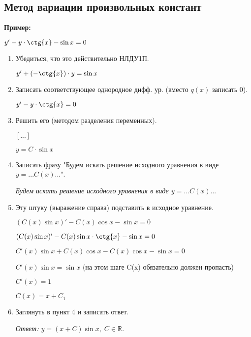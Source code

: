\documentclass[10pt, a4paper]{article}
\begin{document}
\subsection{Метод вариации произвольных констант}
\textbf{Пример:}
\par $y' - y \cdot \ctg{x} - \sin{x} = 0$
\begin{enumerate}
    \item Убедиться, что это действительно НЛДУ1П.
        \par $y' + (-\ctg{x}) \cdot y = \sin{x}$
    \item Записать соответствующее однородное дифф. ур. (вместо $q(x)$ записать $0$).
        \par $y' - y \cdot \ctg{x} = 0$
    \item Решить его (методом разделения переменных).
        \par $[...]$
        \par $y = C \cdot \sin{x}$
    \item Записать фразу "Будем искать решение исходного уравнения в виде $y = ...C(x)...$".
        \par\textit{Будем искать решение исходного уравнения в виде $y = ...C(x)...$}
    \item Эту штуку (выражение справа) подставить в исходное уравнение.
        \par $(C(x)\sin{x})' - C(x)\cos{x} - \sin{x} = 0$
        \par $(C(x)\sin{x})' - C(x)\sin{x} \cdot \ctg{x} - \sin{x} = 0$
        \par $C'(x)\sin{x} + C(x)\cos{x} - C(x)\cos{x} - \sin{x} = 0$
        \par $C'(x)\sin{x} = \sin{x}$ (на этом шаге C(x) обязательно должен пропасть)
        \par $C'(x) = 1$
        \par $C(x) = x + C_{1}$
    \item Заглянуть в пункт 4 и записать ответ.
        \par\textit{Ответ: $y = (x + C)\sin{x},\;C \in \mathbb{R}$.}
\end{enumerate}
\end{document}

